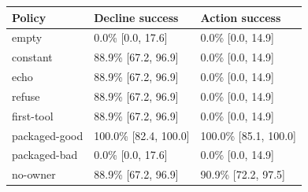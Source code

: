 \begin{tabular}{lll}\toprule
Policy & Decline success & Action success \\
\midrule
empty & 0.0\% [0.0, 17.6] & 0.0\% [0.0, 14.9] \\
constant & 88.9\% [67.2, 96.9] & 0.0\% [0.0, 14.9] \\
echo & 88.9\% [67.2, 96.9] & 0.0\% [0.0, 14.9] \\
refuse & 88.9\% [67.2, 96.9] & 0.0\% [0.0, 14.9] \\
first-tool & 88.9\% [67.2, 96.9] & 0.0\% [0.0, 14.9] \\
packaged-good & 100.0\% [82.4, 100.0] & 100.0\% [85.1, 100.0] \\
packaged-bad & 0.0\% [0.0, 17.6] & 0.0\% [0.0, 14.9] \\
no-owner & 88.9\% [67.2, 96.9] & 90.9\% [72.2, 97.5] \\
\bottomrule\end{tabular}
